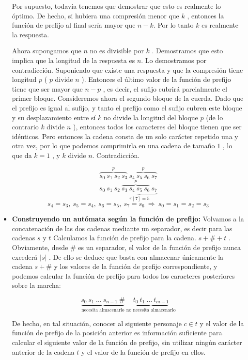 \begin{itemize}
	Por supuesto, todavía tenemos que demostrar que esto es realmente lo óptimo. De hecho, si hubiera una compresión menor que $k$ , entonces la función de prefijo al final sería mayor que $n-k$. Por lo tanto $k$ es realmente la respuesta.
	
	Ahora supongamos que $n$ no es divisible por $k$ . Demostramos que esto implica que la longitud de la respuesta es $n$. Lo demostramos por contradicción. Suponiendo que existe una respuesta y que la compresión tiene longitud $p$ ( $p$ divide $n$ ). Entonces el último valor de la función de prefijo
	tiene que ser mayor que $n-p$ , es decir, el sufijo cubrirá parcialmente el primer bloque. Consideremos ahora el segundo bloque de la cuerda. Dado que el prefijo es igual al sufijo, y tanto el prefijo como el sufijo cubren este bloque y su desplazamiento entre sí $k$ no divide la longitud del bloque $p$ (de lo contrario $k$ divide $n$ ), entonces todos los caracteres del bloque tienen que ser idénticos. Pero entonces la cadena consta de un solo carácter repetido una y otra vez, por lo que podemos comprimirla en una cadena de tamaño $1$ , lo que da $k=1$ , y $k$ divide $n$. Contradicción.
	
	$$\overbrace{s_0 ~ s_1 ~ s_2 ~ s_3}^p ~ \overbrace{s_4 ~ s_5 ~ s_6 ~ s_7}^p$$
	$$s_0 ~ s_1 ~ s_2 ~ \underbrace{\overbrace{s_3 ~ s_4 ~ s_5 ~ s_6}^p ~ s_7}_{\pi[7] = 5}$$
	$$s_4 = s_3, ~ s_5 = s_4, ~ s_6 = s_5, ~ s_7 = s_6 ~ \Rightarrow ~ s_0 = s_1 = s_2 = s_3$$
	
	\item \textbf{Construyendo un autómata según la función de prefijo:} Volvamos a la concatenación de las dos cadenas mediante un separador, es decir para las cadenas $s$ y $t$ Calculamos la función de prefijo para la cadena. $s + \# + t$ . Obviamente, desde $\#$ es un separador, el valor de la función de prefijo nunca excederá $|s|$ . De ello se deduce que basta con almacenar únicamente la cadena $s + \#$ y los valores de la función de prefijo correspondiente, y podemos calcular la función de prefijo para todos los caracteres posteriores sobre la marcha:
	
	$$\underbrace{s_0 ~ s_1 ~ \dots ~ s_{n-1} ~ \#}_{\text{necesita almacenarlo}} ~ \underbrace{t_0 ~ t_1 ~ \dots ~ t_{m-1}}_{\text{no necesita almacenarlo}}$$
	
	De hecho, en tal situación, conocer al siguiente personaje $c \in t$ y el valor de la función de prefijo de la posición anterior es información suficiente para calcular el siguiente valor de la función de prefijo, sin utilizar ningún carácter anterior de la cadena $t$ y el valor de la función de prefijo en ellos.
	

\end{itemize}
